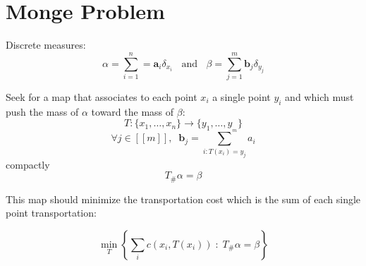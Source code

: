 \section{Monge Problem}

Discrete measures:
$$
\alpha = \sum_{i = 1}^{n} = \mathbf{a}_{i} \delta_{x_{i}}
\;\; \text{ and } \;\;
\beta = \sum_{j=1}^{m} \mathbf{b}_{j} \delta _{y_{j}}
$$

Seek for a map that associates to each point $x_{i}$ a single point $y_{i}$ and which must push the mass of $\alpha$ toward the mass of $\beta$:
$$
T: \{ x_{1}, \dots, x_{n} \} \to \{ y_{1}, \dots, y_{_{m}} \}
$$
$$
\forall j \in [[ m ]], \;\; \mathbf{b}_{j} = \sum_{i: T(x_{i}) = y_{j}} a_{i}
$$
compactly
$$
T_{\#} \alpha = \beta
$$

This map should minimize the transportation cost which is the sum of each single point transportation:

$$
\min_{T} \left\{ \sum_{i} c( x_{i}, T(x_{i}) )
\; : \;
T_{\#} \alpha = \beta \right\}
$$
